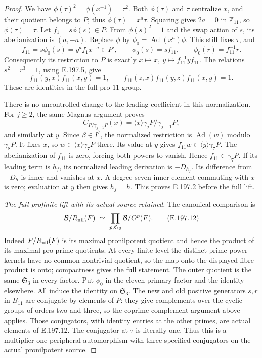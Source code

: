 \begin{proof}
We have \(\phi(\tau)^2=\phi(x^{-1})=\tau^2\).
Both \(\phi(\tau)\) and \(\tau\) centralize \(x\), and
their quotient belongs to \(P\); thus
\(\phi(\tau)=x^a\tau\).  Squaring gives \(2a=0\) in
\(\mathbb Z_{11}\), so \(\phi(\tau)=\tau\).
Let \(f_1=s\phi(s)\in P\).  From \(\phi(s)^2=1\)
and the swap action of \(s\), its abelianization is
\((a,-a)\).  Replace \(\phi\) by
\(\phi_0=\operatorname{Ad}(x^a)\phi\).  This still fixes
\(\tau\), and
\[
 f_{11}=s\phi_0(s)=y^a f_1x^{-a}\in P',\qquad
 \phi_0(s)=sf_{11},\qquad \phi_0(r)=f_{11}^{-1}r.
\tag{E.197.9}
\]
Consequently its restriction to \(P\) is exactly
\(x\mapsto x,\ y\mapsto f_{11}^{-1}yf_{11}\).
The relations \(s^2=r^3=1\), using E.197.5, give
\[
 f_{11}(y,x)f_{11}(x,y)=1,\qquad
 f_{11}(z,x)f_{11}(y,z)f_{11}(x,y)=1.
\tag{E.197.10}
\]
These are identities in the full pro-\(11\) group.

There is no uncontrolled change to the leading coefficient in
this normalization.  For \(j\ge2\), the same Magnus argument
proves
\[
C_{P/\gamma_{j+1}P}(x)
          =\langle x\rangle\gamma_jP/\gamma_{j+1}P,
\tag{E.197.11}
\]
and similarly at \(y\).  Since \(\beta\in I^7\), the
normalized restriction is \(\operatorname{Ad}(w)\) modulo
\(\gamma_8P\).  It fixes \(x\), so
\(w\in\langle x\rangle\gamma_7P\) there.  Its value at
\(y\) gives \(f_{11}w\in\langle y\rangle\gamma_7P\).
The abelianization of \(f_{11}\) is zero, forcing both powers
to vanish.  Hence \(f_{11}\in\gamma_7P\).  If its leading
term is \(h_f\), its normalized leading derivation is
\(-D_{h_f}\).  Its difference from \(-D_h\) is inner and
vanishes at \(x\).  A degree-seven inner element commuting
with \(x\) is zero; evaluation at \(y\) then gives
\(h_f=h\).  This proves E.197.2 before the full lift.

\emph{The full profinite lift with its actual source retained.}
The canonical comparison is
\[
\mathcal B/R_{\rm nil}(F)
       \ \simeq\ 
       \prod_{p,\mathfrak S_3}\mathcal B/O^p(F).
\tag{E.197.12}
\]
Indeed \(F/R_{\rm nil}(F)\) is its maximal pronilpotent
quotient and hence the product of its maximal pro-prime
quotients.  At every finite level the distinct prime-power
kernels have no common nontrivial quotient, so the map onto
the displayed fibre product is onto; compactness gives the
full statement.  The outer quotient is the same
\(\mathfrak S_3\) in every factor.
Put \(\phi_0\) in the eleven-primary factor and the identity
elsewhere.  All induce the identity on \(\mathfrak S_3\).
The new and old positive generators \(s,r\) in \(B_{11}\)
are conjugate by elements of \(P\): they give complements
over the cyclic groups of orders two and three, so the coprime
complement argument above applies.  Those conjugators, with
identity entries at the other primes, are actual elements of
E.197.12.  The conjugator at \(\tau\) is literally one.
Thus this is a multiplier-one peripheral automorphism with
three specified conjugators on the actual pronilpotent source.


\end{proof}
